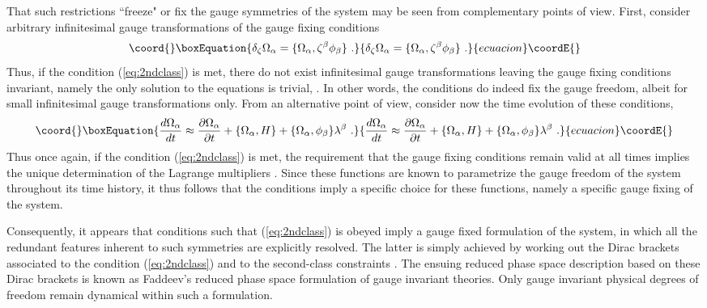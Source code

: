 \documentclass[a4paper,11pt]{article}
\begin{document}
That such restrictions ``freeze" or fix the gauge symmetries of the system
may be seen from complementary points of view. First, consider arbitrary
infinitesimal gauge transformations of the gauge fixing conditions
\begin{equation}\coord{}\boxEquation{
\delta_\zeta\Omega_\alpha=\{\Omega_\alpha,\zeta^\beta\phi_\beta\}\ .
}{
\delta_\zeta\Omega_\alpha=\{\Omega_\alpha,\zeta^\beta\phi_\beta\}\ .
}{ecuacion}\coordE{}\end{equation}
Thus, if the condition (\ref{eq:2ndclass}) is met, there do not exist
infinitesimal gauge transformations leaving the gauge fixing conditions
invariant, namely the only solution to the equations 
\coordHE{} is trivial, \coordHE{}. 
In other words, the conditions \coordHE{} do 
indeed fix the gauge freedom, albeit for small infinitesimal gauge 
transformations only.
From an alternative point of view, consider now the time evolution of these
conditions,
\begin{equation}\coord{}\boxEquation{
\frac{d\Omega_\alpha}{dt}\approx\frac{\partial\Omega_\alpha}{\partial t}+
\{\Omega_\alpha,H\}+\{\Omega_\alpha,\phi_\beta\}\lambda^\beta\ .
}{
\frac{d\Omega_\alpha}{dt}\approx\frac{\partial\Omega_\alpha}{\partial t}+
\{\Omega_\alpha,H\}+\{\Omega_\alpha,\phi_\beta\}\lambda^\beta\ .
}{ecuacion}\coordE{}\end{equation}
Thus once again, if the condition (\ref{eq:2ndclass}) is met, the requirement
that the gauge fixing conditions \coordHE{} remain valid at all
times implies the unique determination of the Lagrange multipliers 
\coordHE{}. Since these functions are known to parametrize the
gauge freedom of the system throughout its time history, it thus follows
that the conditions \coordHE{} imply a specific choice for these
functions, namely a specific gauge fixing of the system.

Consequently, it appears that conditions \coordHE{} such
that (\ref{eq:2ndclass}) is obeyed imply a gauge fixed formulation of
the system, in which all the redundant features inherent to such
symmetries are explicitly resolved. The latter is simply achieved by
working out the Dirac brackets associated to the condition (\ref{eq:2ndclass})
and to the second-class constraints \coordHE{}.
The ensuing reduced phase space description based on these Dirac brackets
is known as Faddeev's reduced phase space formulation of gauge invariant 
theories.\cite{Fad} Only gauge invariant physical degrees of freedom remain
dynamical within such a formulation.
\end{document}
